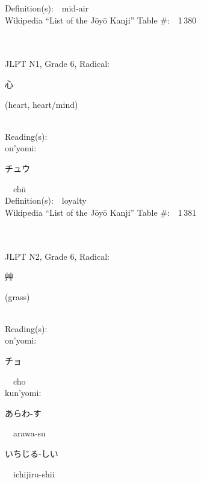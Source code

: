 \begin{multicols}{2}
Definition(s):\ \ mid-air \\
Wikipedia ``List of the J\=oy\=o Kanji'' Table \#:\ \ 1\,380 \\
\ \ \\
{\fontsize{34pt}{40pt}  }\ \ \\  %
{JLPT N1, Grade 6, Radical:\ \ {\begin{CJK}{UTF8}{min} 心 \end{CJK}} (heart, heart/mind) } \\
Reading(s):\ \ \\
{\hspace*{1em}}on'yomi:\ \ \\
{\hspace*{2em}}{\begin{CJK}{UTF8}{min} チュウ \end{CJK}}\ \ ch\=u\ \ \\
Definition(s):\ \ loyalty \\
Wikipedia ``List of the J\=oy\=o Kanji'' Table \#:\ \ 1\,381 \\
\ \ \\
{\fontsize{34pt}{40pt}  }\ \ \\  %
{JLPT N2, Grade 6, Radical:\ \ {\begin{CJK}{UTF8}{min} 艸 \end{CJK}} (grass) } \\
Reading(s):\ \ \\
{\hspace*{1em}}on'yomi:\ \ \\
{\hspace*{2em}}{\begin{CJK}{UTF8}{min} チョ \end{CJK}}\ \ cho\ \ \\
{\hspace*{1em}}kun'yomi:\ \ \\
{\hspace*{2em}}{\begin{CJK}{UTF8}{min} あらわ-す \end{CJK}}\ \ arawa-su\ \ \\
{\hspace*{2em}}{\begin{CJK}{UTF8}{min} いちじる-しい \end{CJK}}\ \ ichijiru-shii\ \ \\

\end{multicols}
